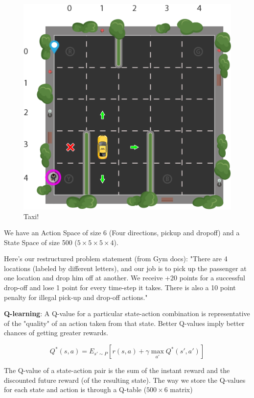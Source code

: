 \documentclass{article}
\begin{document}
\begin{figure}[H]
  \includegraphics[width=\linewidth]{Reinforcement_Learning_Taxi_Env.width-1200.png}
  \caption{Taxi!}
\end{figure}

We have an Action Space of size 6 (Four directions, pickup and dropoff) and a State Space of size 500 ($5 \times 5 \times 5 \times 4$).

Here's our restructured problem statement (from Gym docs):
"There are 4 locations (labeled by different letters), and our job is to pick up the passenger at one location and drop him off at another. We receive +20 points for a successful drop-off and lose 1 point for every time-step it takes. There is also a 10 point penalty for illegal pick-up and drop-off actions."

\textbf{Q-learning}: A Q-value for a particular state-action combination is representative of the "quality" of an action taken from that state. Better Q-values imply better chances of getting greater rewards.

$$
  Q^*(s, a) = E_{s' \sim P} [r(s, a) + \gamma \max_{a'} Q^*(s', a')]
$$

The Q-value of a state-action pair is the sum of the instant reward and the discounted future reward (of the resulting state). The way we store the Q-values for each state and action is through a Q-table ($500 \times 6$ matrix)
\end{document}
